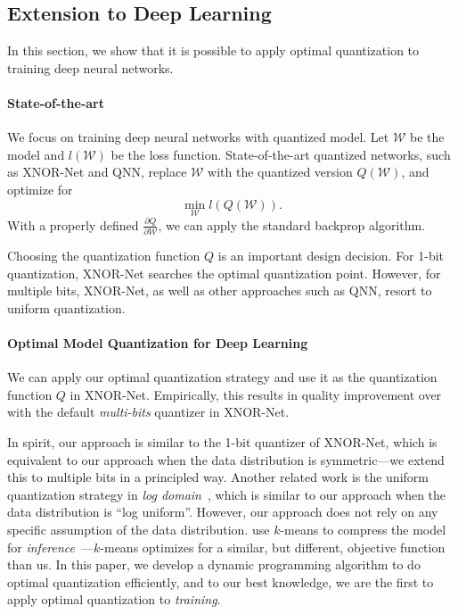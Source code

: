\documentclass{article}
\begin{document}


\vspace{-0.5em}
\subsection{Extension to Deep Learning}
\vspace{-0.5em}

In this section, we show that it is possible 
to apply optimal quantization to
training deep neural networks.

\paragraph*{State-of-the-art} We focus on
training deep neural networks with quantized
model. Let $\mathcal{W}$ be the model and 
$l(\mathcal{W})$ be the loss function. State-of-the-art quantized networks,
such as XNOR-Net and QNN, replace $\mathcal{W}$
with the quantized version $Q(\mathcal{W})$, and optimize
for
\[
\min_{\mathcal{W}} l(Q(\mathcal{W})).
\]
With a properly defined 
$\frac{\partial Q}{\partial{\mathcal{W}}}$, we can
apply the standard backprop 
algorithm.

Choosing the quantization function $Q$ is
an important design decision. For 1-bit quantization,
XNOR-Net searches the optimal quantization point. However, for multiple bits,
XNOR-Net, as well as other approaches such as QNN, resort
to uniform quantization.

\vspace{-0.5em}
\paragraph*{Optimal Model Quantization for Deep Learning}

We can apply our optimal quantization strategy 
and use it as the quantization function $Q$
in XNOR-Net. Empirically, this results in 
quality improvement
over with the default {\em multi-bits} quantizer in XNOR-Net. 

In spirit, our approach is similar to the 1-bit quantizer of
XNOR-Net, which is equivalent to our approach when the data
distribution is symmetric---we extend this
to multiple bits in a principled way. Another related work
is the uniform quantization strategy 
in {\em log domain}~\cite{miyashita2016convolutional},
which is similar to our approach when the data distribution
is ``log uniform''. However, our approach does not rely on
any specific assumption of the data distribution.
\citet{Han:2016:ICLR} use $k$-means to
compress the model for {\em inference}~---$k$-means
optimizes for a similar, but different, objective
function than us. In this paper, we 
develop a dynamic
programming algorithm to do optimal quantization efficiently,
and to our best knowledge, we
are the first to apply optimal quantization to
{\em training}.
\end{document}
